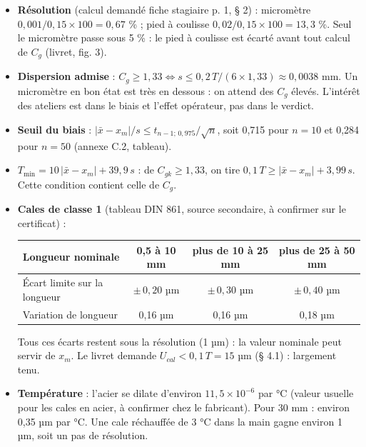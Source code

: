 \documentclass[10pt,a4paper]{article}
\begin{document}
\begin{itemize}
\item \textbf{Résolution} (calcul demandé fiche stagiaire p. 1, § 2) : micromètre $0{,}001/0{,}15\times100 = 0{,}67$ \% ; pied à coulisse $0{,}02/0{,}15\times100 = 13{,}3$ \%. Seul le micromètre passe sous 5 \% : le pied à coulisse est écarté avant tout calcul de $C_g$ (livret, fig. 3).
\item \textbf{Dispersion admise} : $C_g \ge 1{,}33 \iff s \le 0{,}2\,T/(6 \times 1{,}33) \approx 0{,}0038$ mm. Un micromètre en bon état est très en dessous : on attend des $C_g$ élevés. L'intérêt des ateliers est dans le biais et l'effet opérateur, pas dans le verdict.
\item \textbf{Seuil du biais} : $\lvert\bar x - x_m\rvert / s \le t_{n-1;\,0{,}975}/\sqrt n$, soit 0,715 pour $n = 10$ et 0,284 pour $n = 50$ (annexe C.2, tableau).
\item \textbf{$T_{\min} = 10\,\lvert\bar x - x_m\rvert + 39{,}9\,s$} : de $C_{gk} \ge 1{,}33$, on tire $0{,}1\,T \ge \lvert\bar x - x_m\rvert + 3{,}99\,s$. Cette condition contient celle de $C_g$.
\item \textbf{Cales de classe 1} (tableau DIN 861, source secondaire, à confirmer sur le certificat) :
\begin{center}\small
\begin{tabular}{@{}lccc@{}}
\toprule
Longueur nominale & 0,5 à 10 mm & plus de 10 à 25 mm & plus de 25 à 50 mm\\\midrule
Écart limite sur la longueur & $\pm\,0{,}20$ µm & $\pm\,0{,}30$ µm & $\pm\,0{,}40$ µm\\
Variation de longueur & 0,16 µm & 0,16 µm & 0,18 µm\\
\bottomrule
\end{tabular}
\end{center}
Tous ces écarts restent sous la résolution (1 µm) : la valeur nominale peut servir de $x_m$. Le livret demande $U_{cal} < 0{,}1\,T = 15$ µm (§ 4.1) : largement tenu.
\item \textbf{Température} : l'acier se dilate d'environ $11{,}5 \times 10^{-6}$ par °C (valeur usuelle pour les cales en acier, à confirmer chez le fabricant). Pour 30 mm : environ 0,35 µm par °C. Une cale réchauffée de 3 °C dans la main gagne environ 1 µm, soit un pas de résolution.
\end{itemize}
\end{document}
